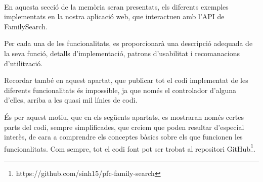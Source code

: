 
    \paragraph{}
    En aquesta secció de la memòria seran presentats, els diferents exemples implementats en la nostra aplicació web, que interactuen amb l'API de FamilySearch.

    Per cada una de les funcionalitats, es proporcionarà una descripció adequada de la seva funció, detalls d'implementació, patrons d'usabilitat i recomanacions d'utilització.

    Recordar també en aquest apartat, que publicar tot el codi implementat de les diferents funcionalitats és impossible, ja que només el controlador d'alguna d'elles, arriba a les quasi mil línies de codi.

    És per aquest motiu, que en els següents apartats, es mostraran només certes parts del codi, sempre simplificades, que creiem que poden resultar d'especial interès, de cara a comprendre els conceptes bàsics sobre els que funcionen les funcionalitats. Com sempre, tot el codi font pot ser trobat al repositori GitHub\footnote{https://github.com/sinh15/pfc-family-search}.
